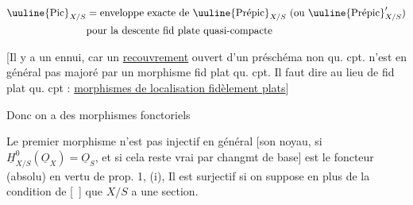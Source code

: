

\[
\begin{aligned}
\text{\uuline{Pic}}_{X/S}&=\text{enveloppe exacte de }\text{\uuline{Prépic}}_{X/S}\ (\text{ou }\text{\uuline{Prépic}}'_{X/S})\\
&\text{pour la descente fid plate quasi-compacte}
\end{aligned}
\]

[Il y a un ennui, car un \uline{recouvrement} ouvert d'un préschéma non qu. cpt. n'est en général pas majoré par un morphisme fid plat qu. cpt. Il faut  dire au lieu de fid plat qu. cpt :  \uline{morphismes de localisation fidèlement plats}]

Donc on a des morphismes fonctoriels


Le premier morphisme n'est pas injectif en général [son noyau, si $\underline H^0_{X/S}(\underline O_X)=\underline O_S$, et si cela reste vrai par changmt de base] est le foncteur  (absolu) en vertu de prop. 1, (i),  Il est surjectif si on suppose en plus de la condition de [~] que $X/S$ a une section. 

